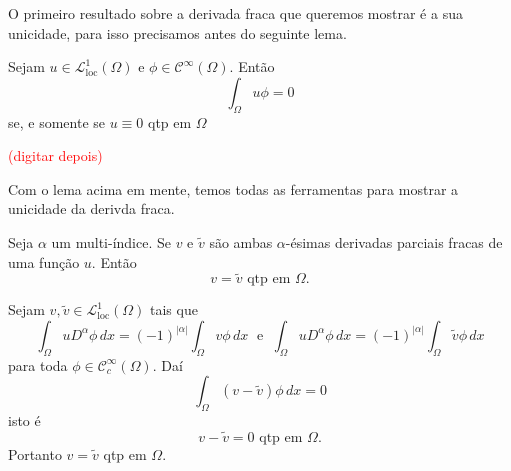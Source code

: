 \documentclass[a4paper, 11pt]{book}
\theoremstyle{definition}
\newcommand{\cC}{\mathcal{C}}
\newcommand{\cL}{\mathcal{L}}
\newcommand{\loc}{\mathrm{loc}}
\begin{document}
O primeiro resultado sobre a derivada fraca que queremos mostrar é a sua unicidade, para isso precisamos antes do seguinte lema.

\begin{lbox}
    Sejam $u \in \cL^1_{\loc}(\Omega)$ e $\phi \in \cC^\infty(\Omega)$.
    Então
    \[
        \int_\Omega u \phi = 0
    \]
    se, e somente se $u \equiv 0$ qtp em $\Omega$
\end{lbox}
\begin{prf}
    \cite{brezis-functional.analysis} \textcolor{red}{(digitar depois)}
\end{prf}

Com o lema acima em mente, temos todas as ferramentas para mostrar a unicidade da derivda fraca.

\begin{pbox}
    Seja $\alpha$ um multi-índice. Se $v$ e $\tilde v$ são ambas $\alpha$-ésimas derivadas parciais fracas de uma função $u$.
    Então
    \[
        v = \tilde v \text{ qtp em } \Omega.
    \]
\end{pbox}
\begin{prf}
    Sejam $v, \tilde v \in \cL^1_{\mathrm{loc}}(\Omega)$ tais que
    \[
        \int_\Omega u D^\alpha \phi \,dx = (-1)^{|\alpha|} \int_\Omega v \phi \,dx \;\text{ e }\; \int_\Omega u D^\alpha \phi \, dx= (-1)^{|\alpha|}\int_\Omega \tilde v \phi \,dx
    \]
    para toda $\phi \in \cC^\infty_c(\Omega)$. Daí
    \[
        \int_\Omega (v - \tilde v) \phi \, dx = 0
    \]
    isto é
    \[
        v - \tilde v = 0 \text{ qtp em } \Omega.
    \]
    Portanto $v = \tilde v$ qtp em $\Omega$.
\end{prf}
\end{document}
